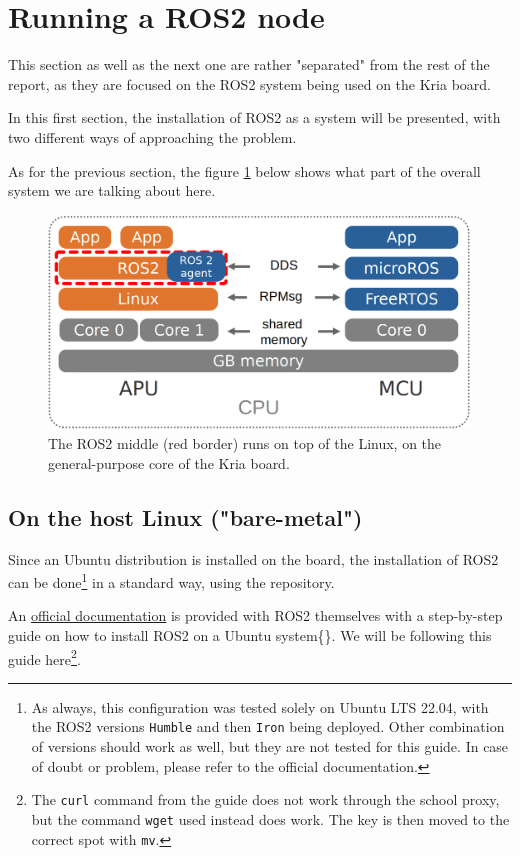 \documentclass[10pt]{article}
\begin{document}
\section{Running a ROS2 node}
\label{sec:orgd572365}
This section as well as the next one are rather "separated" from the rest of the report, as
they are focused on the ROS2 system being used on the Kria board.

In this first section, the installation of ROS2 as a system will be presented, with
two different ways of approaching the problem.

As for the previous section, the figure \ref{fig:orgb28f213} below shows what part
of the overall system we are talking about here.

\begin{figure}[htbp]
\centering
\includegraphics[width=.6\textwidth]{./img/map_ros.png}
\caption{\label{fig:orgb28f213}The ROS2 middle (red border) runs on top of the Linux, on the general-purpose core of the Kria board.}
\end{figure}

\subsection{On the host Linux ("bare-metal")}
\label{sec:org49979a3}
Since an Ubuntu distribution is installed on the board, the installation of ROS2
can be done\footnote{As always, this configuration was tested solely on Ubuntu LTS 22.04,
with the ROS2 versions \texttt{Humble} and then \texttt{Iron} being deployed.
Other combination of versions should work as well, but they are not
tested for this guide. In case of doubt or problem, please refer to the official documentation.} in a standard way, using the repository.

An \href{https://docs.ros.org/en/humble/Installation/Ubuntu-Install-Debians.html}{official documentation} is provided with ROS2 themselves with a step-by-step guide on how to install
ROS2 on a Ubuntu system\{\}.
We will be following this guide here\footnote{The \texttt{curl} command from the guide does not work through the school proxy,
but the command \texttt{wget} used instead does work. The key is then moved to the correct spot with \texttt{mv}.}.
\end{document}
